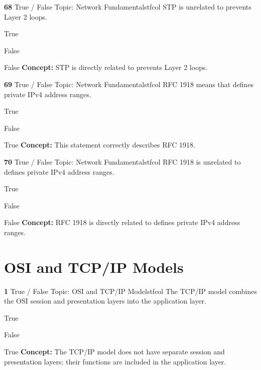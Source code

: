 \documentclass[10pt,a4paper]{article}
\begin{document}
\begin{qcard}{\color{white}\textbf{68} \hfill \small True / False \textbar{} Topic: Network Fundamentals}{tfcol}
STP is unrelated to prevents Layer 2 loops.

\begin{qoptions}
\item True
\item False
\end{qoptions}
\begin{explainbox}{False}
\textbf{Concept:} STP is directly related to prevents Layer 2 loops.
\end{explainbox}
\end{qcard}

\begin{qcard}{\color{white}\textbf{69} \hfill \small True / False \textbar{} Topic: Network Fundamentals}{tfcol}
RFC 1918 means that defines private IPv4 address ranges.

\begin{qoptions}
\item True
\item False
\end{qoptions}
\begin{explainbox}{True}
\textbf{Concept:} This statement correctly describes RFC 1918.
\end{explainbox}
\end{qcard}

\begin{qcard}{\color{white}\textbf{70} \hfill \small True / False \textbar{} Topic: Network Fundamentals}{tfcol}
RFC 1918 is unrelated to defines private IPv4 address ranges.

\begin{qoptions}
\item True
\item False
\end{qoptions}
\begin{explainbox}{False}
\textbf{Concept:} RFC 1918 is directly related to defines private IPv4 address ranges.
\end{explainbox}
\end{qcard}

\section{OSI and TCP/IP Models}
\begin{qcard}{\color{white}\textbf{1} \hfill \small True / False \textbar{} Topic: OSI and TCP/IP Models}{tfcol}
The TCP/IP model combines the OSI session and presentation layers into the application layer.

\begin{qoptions}
\item True
\item False
\end{qoptions}
\begin{explainbox}{True}
\textbf{Concept:} The TCP/IP model does not have separate session and presentation layers; their functions are included in the application layer.
\end{explainbox}
\end{qcard}
\end{document}

